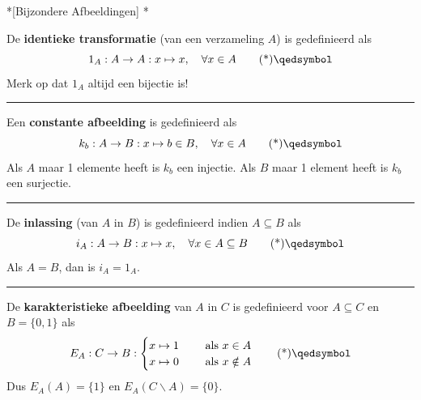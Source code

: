 \begin{nicedefinition}*[Bijzondere Afbeeldingen]
    *

    De \textcolor{PineGreen!75!black}{\textbf{identieke transformatie}} (van een verzameling $A$) is gedefinieerd als
    \begin{equation}
        1_A: A \rightarrow A: x \mapsto x, \quad \forall x \in A \qedtag
    \end{equation}
    Merk op dat $1_A$ altijd een bijectie is!

    \vspace{0.25cm}
    \hrule

    \vspace{0.5cm}

    Een \textcolor{PineGreen!75!black}{\textbf{constante afbeelding}} is gedefinieerd als
    \begin{equation}
        k_b: A \rightarrow B: x \mapsto b \in B, \quad \forall x \in A \qedtag
    \end{equation}
    Als $A$ maar 1 elemente heeft is $k_b$ een injectie. \newline
    Als $B$ maar 1 element heeft is $k_b$ een surjectie.

    \vspace{0.25cm}
    \hrule

    \vspace{0.5cm}

    De \textcolor{PineGreen!75!black}{\textbf{inlassing}} (van $A$ in $B$) is gedefinieerd indien $A \subseteq B$ als
    \begin{equation}
        i_A: A \rightarrow B: x \mapsto x, \quad \forall x \in A \subseteq B \qedtag
    \end{equation}
    Als $A=B$, dan is $i_A = 1_A$.
    \begin{center}
        \resizebox{0.5\textwidth}{!}{
            
        }
    \end{center}

    \vspace{0.25cm}
    \hrule

    \vspace{0.5cm}

    De \textcolor{PineGreen!75!black}{\textbf{karakteristieke afbeelding}} van $A$ in $C$ is gedefinieerd voor $A \subseteq C$ en $B = \{0,1\}$ als
    \begin{equation}
        E_A : C \rightarrow B : \begin{cases}
            x \mapsto 1 & \quad \text{ als } x \in A \\
            x \mapsto 0 & \quad \text{ als } x \notin A
        \end{cases} \qedtag
    \end{equation}
    Dus $E_A(A) = \{1\}$ en $E_A(C \backslash A) = \{0\}$.


\end{nicedefinition}

